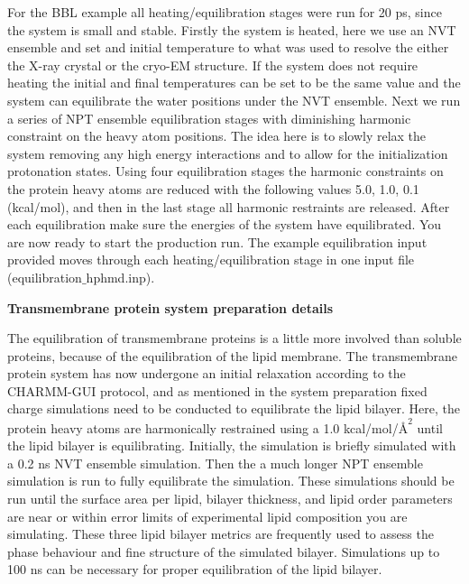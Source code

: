 \documentclass[9pt,tutorial]{livecoms}
\begin{document}
For the BBL example all heating/equilibration stages were run for 20 ps, since the system is small and stable. 
Firstly the system is heated, here we use an NVT ensemble and set and initial temperature to what was used to resolve the either the X-ray crystal or the cryo-EM structure. 
If the system does not require heating the initial and final temperatures can be set to be the same value and the system can equilibrate the water positions under the NVT ensemble.
Next we run a series of NPT ensemble equilibration stages with diminishing harmonic constraint on the heavy atom positions. 
The idea here is to slowly relax the system removing any high energy interactions and to allow for the initialization protonation states.
Using four equilibration stages the harmonic constraints on the protein heavy atoms are reduced with the following values 5.0, 1.0, 0.1 (kcal/mol), and then in the last stage all harmonic restraints are released.
After each equilibration make sure the energies of the system have equilibrated.
You are now ready to start the production run. 
The example equilibration input provided moves through each heating/equilibration stage in one input file (equilibration$\_$hphmd.inp). 

\noindent
\textbf{Transmembrane protein system preparation details}

The equilibration of transmembrane proteins is a little more involved than soluble proteins, because of the equilibration of the lipid membrane. 
The transmembrane protein system has now undergone an initial relaxation according to the CHARMM-GUI protocol, and as mentioned in the system preparation fixed charge simulations need to be conducted to equilibrate the lipid bilayer.
Here, the protein heavy atoms are harmonically restrained using a 1.0 kcal/mol/$\mbox{\AA}^2$ until the lipid bilayer is equilibrating. 
Initially, the simulation is briefly simulated with a 0.2 ns NVT ensemble simulation.
Then the a much longer NPT ensemble simulation is run to fully equilibrate the simulation. 
These simulations should be run until the surface area per lipid, bilayer thickness, and lipid order parameters are near or within error limits of experimental lipid composition you are simulating.\cite{Huang_Shen_2020_}
These three lipid bilayer metrics are frequently used to assess the phase behaviour and fine structure of the simulated bilayer.\cite{Klauda_JPhysChemB_2010_v114_p7830}
Simulations up to 100 ns can be necessary for proper equilibration of the lipid bilayer.
\end{document}
